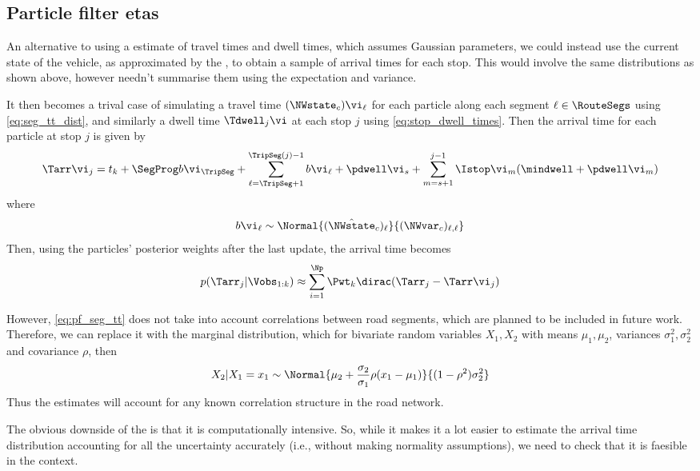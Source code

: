 \subsection{Particle filter \glspl{eta}}
\label{sec:trip_etas_pf}

An alternative to using a \kf{} estimate of travel times and dwell times,
which assumes Gaussian parameters,
we could instead use the current state of the vehicle,
as approximated by the \pf{},
to obtain a sample of arrival times for each stop.
This would involve the same distributions as shown above,
however needn't summarise them using the expectation and variance.


It then becomes a trival case of simulating
a travel time $(\NWstate_c)\vi_\ell$ for each particle
along each segment $\ell\in\RouteSegs$ using \cref{eq:seg_tt_dist},
and similarly a dwell time $\Tdwell_j\vi$
at each stop $j$ using \cref{eq:stop_dwell_times}.
Then the arrival time for each particle at stop $j$ is given by
\begin{equation}
\label{eq:pf_eta_estimate}
\Tarr\vi_j =
t_k +
\SegProg b\vi_\TripSeg +
\sum_{\ell=\TripSeg+1}^{\TripSeg(j)-1}
    b\vi_\ell +
\pdwell\vi_s +
\sum_{m=s+1}^{j-1} \Istop\vi_m(\mindwell + \pdwell\vi_m)
\end{equation}
where
\begin{equation}
\label{eq:pf_seg_tt}
b\vi_\ell \sim
\Normal{(\hat\NWstate_c)_\ell}{(\NWvar_c)_{\ell,\ell}}
\end{equation}
Then, using the particles' posterior weights after the last update,
the arrival time becomes
\begin{equation}
\label{eq:pf_eta_dist}
p(\Tarr_j | \Vobs_{1:k}) \approx
    \sum_{i=1}^\Np \Pwt_k \dirac (\Tarr_j - \Tarr\vi_j)
\end{equation}


However, \cref{eq:pf_seg_tt} does not take into account
correlations between road segments,
which are planned to be included in future work.
Therefore, we can replace it with the marginal distribution,
which for bivariate \normal{} random variables $X_1,X_2$
with means $\mu_1,\mu_2$,
variances $\sigma_1^2,\sigma_2^2$
and covariance $\rho$, then
\begin{equation}
\label{eq:pf_seg_tt_marginal}
X_2 | X_1 = x_1 \sim
\Normal{\mu_2 + \frac{\sigma_2}{\sigma_1}\rho(x_1 - \mu_1)}
{(1-\rho^2)\sigma_2^2}
\end{equation}
Thus the \pf{} estimates will account for any known
correlation structure in the road network.


The obvious downside of the \pf{} is that
it is computationally intensive.
So, while it makes it a lot easier to estimate
the arrival time distribution
accounting for all the uncertainty accurately
(i.e., without making normality assumptions),
we need to check that it is faesible in the \rt{} context.
